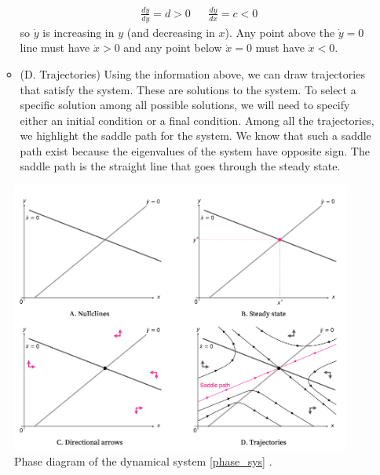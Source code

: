 \documentclass[11pt,a4paper]{book}
\theoremstyle{definition}\newtheorem{definition}{Definition}
\theoremstyle{definition}\newtheorem{fact}{Fact}
\theoremstyle{definition}\newtheorem{remark}{Remark}
\theoremstyle{definition}\newtheorem{ex}{Ex.}
\theoremstyle{definition}\newtheorem{project}{Project}
\theoremstyle{definition}\newtheorem{problem}{Problem}
\theoremstyle{definition}\newtheorem{example}{Example}
\numberwithin{theorem}{section}
\numberwithin{corollary}{chapter}
\numberwithin{assumption}{chapter}
\numberwithin{definition}{chapter}
\numberwithin{prop}{chapter}
\numberwithin{notation}{chapter}
\numberwithin{problem}{chapter}
\numberwithin{example}{chapter}
\numberwithin{fact}{chapter}
\numberwithin{ex}{chapter}
\begin{document}
\begin{enumerate}
\begin{itemize}
\begin{align*}
				\frac{d \dot{y}}{dy} = d > 0 && \frac{d\dot{y}}{dx} = c < 0
			\end{align*}
			so $\dot{y}$ is increasing in $y$ (and decreasing in $x$). Any point above the $\dot{y} = 0$ line must have $\dot{x} > 0$ and any point below $\dot{x}=0$ must have $\dot{x} < 0$. 
			\item (D. Trajectories) Using the information above, we can draw trajectories that satisfy the system. These are solutions to the system.  To select a specific solution among all possible solutions, we will need to specify either an initial condition or a final condition. Among all the trajectories, we highlight the saddle path for the system. We know that such a saddle path exist because the eigenvalues of the system have opposite sign. The saddle path is the straight line that goes through the steady state.
		\end{itemize}
	\end{enumerate}
	
	\begin{figure}[ht]
		\centering
		\includegraphics[scale=0.4]{figs/phasediag.png}
		\caption{Phase diagram of the dynamical system \eqref{phase_sys} \citep{michaillat2023} .}
		\label{fig:exmaple_phase}
	\end{figure}
	
\end{document}
